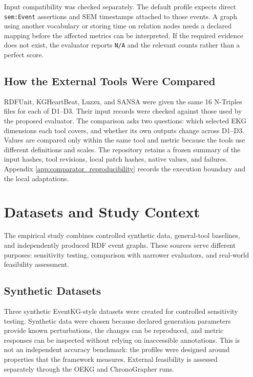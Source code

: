 Input compatibility was checked separately. The default profile expects direct \texttt{sem:Event} assertions and SEM timestamps attached to those events. A graph using another vocabulary or storing time on relation nodes needs a declared mapping before the affected metrics can be interpreted. If the required evidence does not exist, the evaluator reports \texttt{N/A} and the relevant counts rather than a perfect score.

\subsection{How the External Tools Were Compared}

RDFUnit, KGHeartBeat, Luzzu, and SANSA were given the same 16 N-Triples files for each of D1--D3. Their input records were checked against those used by the proposed evaluator. The comparison asks two questions: which selected EKG dimensions each tool covers, and whether its own outputs change across D1--D3. Values are compared only within the same tool and metric because the tools use different definitions and scales. The repository retains a frozen summary of the input hashes, tool revisions, local patch hashes, native values, and failures. Appendix \ref{app:comparator_reproducibility} records the execution boundary and the local adaptations.

\section{Datasets and Study Context}

The empirical study combines controlled synthetic data, general-tool baselines, and independently produced RDF event graphs. These sources serve different purposes: sensitivity testing, comparison with narrower evaluators, and real-world feasibility assessment.

\subsection{Synthetic Datasets}

Three synthetic EventKG-style datasets were created for controlled sensitivity testing. Synthetic data were chosen because declared generation parameters provide known perturbations, the changes can be reproduced, and metric responses can be inspected without relying on inaccessible annotations. This is not an independent accuracy benchmark: the profiles were designed around properties that the framework measures. External feasibility is assessed separately through the OEKG and ChronoGrapher runs.

